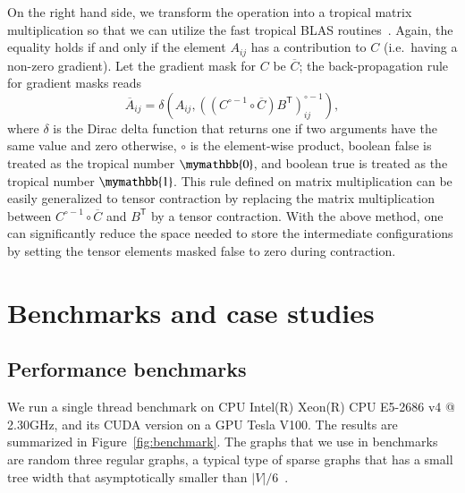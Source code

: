 \documentclass[onefignum, onetabnum]{siamart190516}
\newcommand{\<}{\langle}
\renewcommand{\>}{\rangle}
\begin{document}
On the right hand side, we transform the operation into a tropical matrix multiplication so that we can utilize the fast tropical BLAS routines~\cite{TropicalGEMM}.
Again, the equality holds if and only if the element $A_{ij}$ has a contribution to $C$ (i.e.\ having a non-zero gradient).
Let the gradient mask for $C$ be $\overline C$; the back-propagation rule for gradient masks reads
\begin{equation}\label{eq:adrule}
\overline{A}_{ij} = \delta \left(A_{ij}, \left( \left( C^{\circ-1} \circ \overline C \right) B^{\mathsf{T}} \right)_{ij}^{\circ -1} \right),
\end{equation}
where $\delta$ is the Dirac delta function that returns one if two arguments have the same value and zero otherwise, $\circ$ is the element-wise product, boolean false is treated as the tropical number $\mymathbb{0}$, and boolean true is treated as the tropical number $\mymathbb{1}$.
This rule defined on matrix multiplication can be easily generalized to tensor contraction by replacing the matrix multiplication between $C^{\circ-1} \circ \overline C$ and $B^{\mathsf{T}}$ by a tensor contraction.
With the above method, one can significantly reduce the space needed to store the intermediate configurations by setting the tensor elements masked false to zero during contraction.

\section{Benchmarks and case studies}
\subsection{Performance benchmarks}
We run a single thread benchmark on CPU Intel(R) Xeon(R) CPU E5-2686 v4 @ 2.30GHz,
and its CUDA version on a GPU Tesla V100.
The results are summarized in Figure~\ref{fig:benchmark}.
The graphs that we use in benchmarks are random three regular graphs,
 a typical type of sparse graphs that has a small tree width that asymptotically smaller than $|V|/6$~\cite{Fomin2006}.
\end{document}
